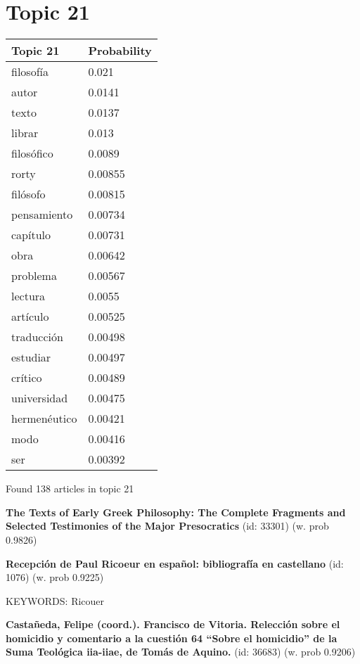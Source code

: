 \documentclass{article}
\begin{document}
\section*{Topic 21}\vfill
\begin{tabular}{ll}
\toprule
     Topic 21 & Probability \\
\midrule
    filosofía &       0.021 \\
        autor &      0.0141 \\
        texto &      0.0137 \\
       librar &       0.013 \\
   filosófico &      0.0089 \\
        rorty &     0.00855 \\
     filósofo &     0.00815 \\
  pensamiento &     0.00734 \\
     capítulo &     0.00731 \\
         obra &     0.00642 \\
     problema &     0.00567 \\
      lectura &      0.0055 \\
     artículo &     0.00525 \\
   traducción &     0.00498 \\
     estudiar &     0.00497 \\
      crítico &     0.00489 \\
  universidad &     0.00475 \\
 hermenéutico &     0.00421 \\
         modo &     0.00416 \\
          ser &     0.00392 \\
\bottomrule
\end{tabular}

\vfill
Found 138 articles in topic 21
\vfill

\textbf{The Texts of Early Greek Philosophy: The Complete Fragments and Selected Testimonies of the Major Presocratics} (id: 33301)
 (w. prob 0.9826)
\vfill

\textbf{Recepción de Paul Ricoeur en español: bibliografía en castellano} (id: 1076)
 (w. prob 0.9225)


KEYWORDS:
Ricouer
\vfill

\textbf{Castañeda, Felipe (coord.). Francisco de Vitoria. Relección sobre el homicidio y comentario a la cuestión 64 “Sobre el homicidio” de la Suma Teológica iia-iiae, de Tomás de Aquino.} (id: 36683)
 (w. prob 0.9206)
\end{document}
